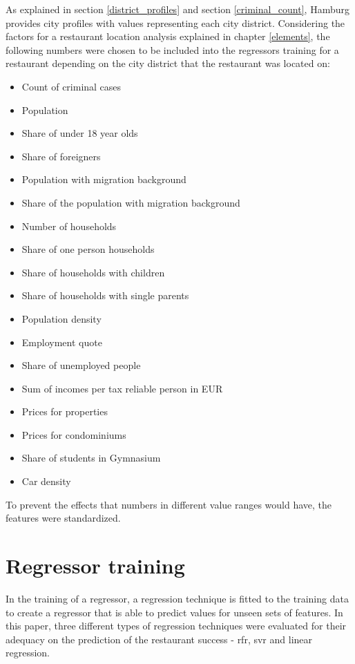 \documentclass[a4paper, 11pt, oneside]{Thesis}  %
\begin{document}
As explained in section \ref{district_profiles} and section \ref{criminal_count}, Hamburg provides city profiles with values representing each city district. Considering the factors for a restaurant location analysis explained in chapter \ref{elements}, the following numbers were chosen to be included into the regressors training for a restaurant depending on the city district that the restaurant was located on:
\begin{itemize}
\item Count of criminal cases
\item Population
\item Share of under 18 year olds
\item Share of foreigners
\item Population with migration background
\item Share of the population with migration background
\item Number of households
\item Share of one person households
\item Share of households with children
\item Share of households with single parents
\item Population density
\item Employment quote
\item Share of unemployed people
\item Sum of incomes per tax reliable person in EUR
\item Prices for properties
\item Prices for condominiums
\item Share of students in Gymnasium
\item Car density
\end{itemize}


To prevent the effects that numbers in different value ranges would have, the features were standardized.

\section{Regressor training}
\label{regressor_training}

In the training of a regressor, a regression technique is fitted to the training data to create a regressor that is able to predict values for unseen sets of features. In this paper, three different types of regression techniques were evaluated for their adequacy on the prediction of the restaurant success - \ac{rfr}, \ac{svr} and linear regression.
\end{document}
